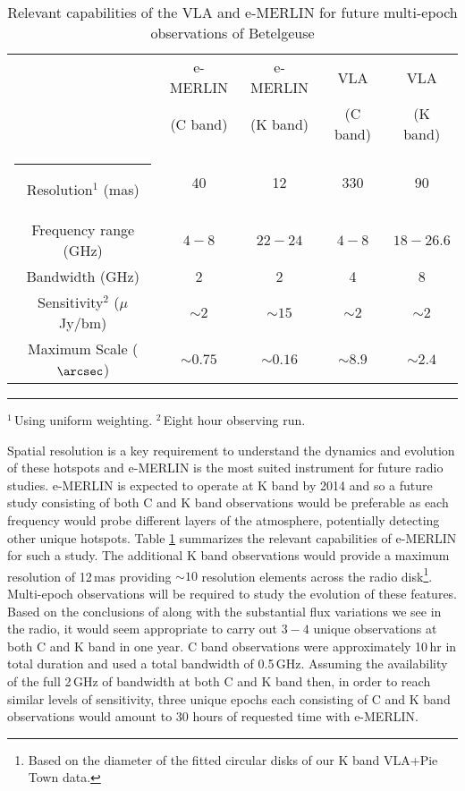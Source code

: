 \begin{table}[hb]
\begin{center}
\caption[Relevant capabilities of the VLA and e-MERLIN]{Relevant capabilities of the VLA and e-MERLIN for future multi-epoch observations of Betelgeuse}
\begin{tabular}{ccccc}
\hline
\hline
\rule{0pt}{2.5ex}  & e-MERLIN  & e-MERLIN & VLA  & VLA \\
\rule{0pt}{2.5ex}  & (C band) & (K band) & (C band) & (K band)\\
\hline
\rule{-2.5pt}{2.5ex}	Resolution$^{1}$ (mas) &  40 & 12 & 330&90\\
					Frequency range (GHz) &  $4-8$ & $22-24$ & $4-8$&$18-26.6$\\
					Bandwidth (GHz) &  2& 2 & 4&8\\
					Sensitivity$^{2}$ ($\mu$ Jy/bm) & $\sim 2$ & $\sim 15$&$\sim 2$&$\sim 2$\\
					Maximum Scale ($\arcsec$) & $\sim 0.75$ & $\sim 0.16$&$\sim 8.9$&$\sim 2.4$\\
\hline
\end{tabular}
\label{tab:8.1}
\begin{minipage}{12.5cm}
\rule{-2.5pt}{2.5ex}{\footnotesize $^{1}$\,Using uniform weighting. $^{2}$\,Eight hour observing run.}
\end{minipage}
\end{center}
\end{table}

Spatial resolution is a key requirement to understand the dynamics and evolution of these hotspots and e-MERLIN is the most suited instrument for future radio studies. e-MERLIN is expected to operate at K band by 2014 and so a future study consisting of both C and K band observations would be preferable as each frequency would probe different layers of the atmosphere, potentially detecting other unique hotspots. Table \ref{tab:8.1} summarizes the relevant capabilities of e-MERLIN for such a study. The additional K band observations would provide a maximum resolution of 12\,mas providing $\sim 10$ resolution elements across the radio disk\footnote{Based on the diameter of the fitted circular disks of our K band VLA+Pie Town data.}. Multi-epoch observations will be required to study the evolution of these features. Based on the conclusions of \cite{ohnaka_2011} along with the substantial flux variations we see in the radio, it would seem appropriate to carry out $3-4$ unique observations at both C and K band in one year. \cite{richards_2013}  C band observations were approximately 10\,hr in total duration and used a total bandwidth of 0.5\,GHz. Assuming the availability of the full 2\,GHz of bandwidth at both C and K band then, in order to reach similar levels of sensitivity, three unique epochs each consisting of C and K band observations would amount to 30 hours of requested time with e-MERLIN.

